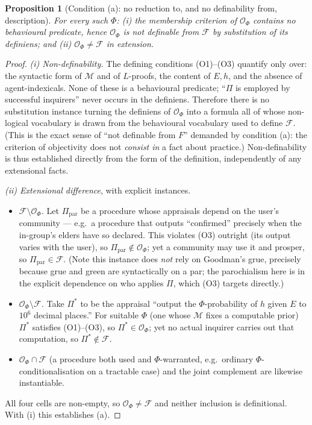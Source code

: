 \documentclass{amsart}
\theoremstyle{definition}
\theoremstyle{plain}
\newtheorem{proposition}{Proposition}
\theoremstyle{remark}
\begin{document}
\begin{proposition}[Condition (a): no reduction to, and no definability from,
description]\label{prop:a}
For every such $\Phi$: \emph{(i)} the membership criterion of
$\mathcal{O}_\Phi$ contains no behavioural predicate, hence $\mathcal{O}_\Phi$
is not definable from $\mathcal{F}$ by substitution of its definiens; and
\emph{(ii)} $\mathcal{O}_\Phi\neq\mathcal{F}$ in extension.
\end{proposition}

\begin{proof}
\emph{(i) Non-definability.} The defining conditions (O1)--(O3) quantify only
over: the syntactic form of $\mathcal{M}$ and of $L$-proofs, the content of
$E,h$, and the absence of agent-indexicals. None of these is a behavioural
predicate; ``$\Pi$ is employed by successful inquirers'' never occurs in the
definiens. Therefore there is no substitution instance turning the definiens of
$\mathcal{O}_\Phi$ into a formula all of whose non-logical vocabulary is drawn
from the behavioural vocabulary used to define $\mathcal{F}$. (This is the exact
sense of ``not definable from $F$'' demanded by condition (a): the criterion of
objectivity does not \emph{consist in} a fact about practice.) Non-definability
is thus established directly from the form of the definition, independently of
any extensional facts.

\emph{(ii) Extensional difference}, with explicit instances.
\begin{itemize}
\item \emph{$\mathcal{F}\setminus\mathcal{O}_\Phi$.} Let $\Pi_{\text{par}}$ be a
procedure whose appraisals depend on the user's community --- e.g.\ a procedure
that outputs ``confirmed'' precisely when the in-group's elders have so
declared. This violates (O3) outright (its output varies with the user), so
$\Pi_{\text{par}}\notin\mathcal{O}_\Phi$; yet a community may use it and
prosper, so $\Pi_{\text{par}}\in\mathcal{F}$. (Note this instance does
\emph{not} rely on Goodman's grue, precisely because grue and green are
syntactically on a par; the parochialism here is in the explicit dependence on
who applies $\Pi$, which (O3) targets directly.)
\item \emph{$\mathcal{O}_\Phi\setminus\mathcal{F}$.} Take $\Pi^\ast$ to be the
appraisal ``output the $\Phi$-probability of $h$ given $E$ to $10^{6}$ decimal
places.'' For suitable $\Phi$ (one whose $\mathcal{M}$ fixes a computable prior)
$\Pi^\ast$ satisfies (O1)--(O3), so $\Pi^\ast\in\mathcal{O}_\Phi$; yet no actual
inquirer carries out that computation, so $\Pi^\ast\notin\mathcal{F}$.
\item \emph{$\mathcal{O}_\Phi\cap\mathcal{F}$} (a procedure both used and
$\Phi$-warranted, e.g.\ ordinary $\Phi$-conditionalisation on a tractable case)
and the joint complement are likewise instantiable.
\end{itemize}
All four cells are non-empty, so $\mathcal{O}_\Phi\neq\mathcal{F}$ and neither
inclusion is definitional. With (i) this establishes (a).
\end{proof}
\end{document}

